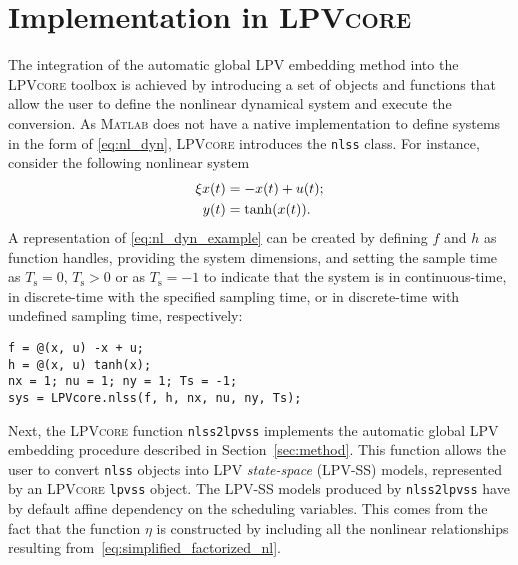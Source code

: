 \section{Implementation in \textsc{LPVcore}\label{sec:implementation}}
The integration of the automatic global LPV embedding method into the \textsc{LPVcore} toolbox is achieved by introducing a set of objects and functions that allow the user to define the nonlinear dynamical system and execute the conversion. As \textsc{Matlab} does not have a native implementation to define systems in the form of \eqref{eq:nl_dyn}, \textsc{LPVcore} introduces the \lstinline{nlss} class. For instance, consider the following nonlinear system
%
\begin{equation}
    \label{eq:nl_dyn_example}
    \begin{aligned}
        \xi x(t) & = -x(t) + u(t); \\
        y(t)       & = \tanh(x(t)).
    \end{aligned}
\end{equation}
%
A representation of \eqref{eq:nl_dyn_example} can be created by defining $f$ and $h$ as function handles, providing the system dimensions, and setting the sample time as \mbox{$T_\mathrm{s} = 0$}, \mbox{$T_\mathrm{s} > 0$} or as \mbox{$T_\mathrm{s} = -1$} to indicate that the system is in continuous-time, in discrete-time with the specified sampling time, or in discrete-time with undefined sampling time, respectively:
\begin{lstlisting}[basicstyle=\ttfamily]
f = @(x, u) -x + u;
h = @(x, u) tanh(x);
nx = 1; nu = 1; ny = 1; Ts = -1;
sys = LPVcore.nlss(f, h, nx, nu, ny, Ts);
\end{lstlisting}
%
%
Next, the \textsc{LPVcore} function \lstinline{nlss2lpvss} implements the automatic global LPV embedding procedure described in Section~\ref{sec:method}. This function allows the user to convert \lstinline{nlss} objects into LPV \emph{state-space} (LPV-SS) models, represented by an \textsc{LPVcore} \lstinline{lpvss} object. The LPV-SS models produced by \lstinline{nlss2lpvss} have by default affine dependency on the scheduling variables. This comes from the fact that the function $\eta$ is constructed by including all the nonlinear relationships resulting from~\eqref{eq:simplified_factorized_nl}. 

